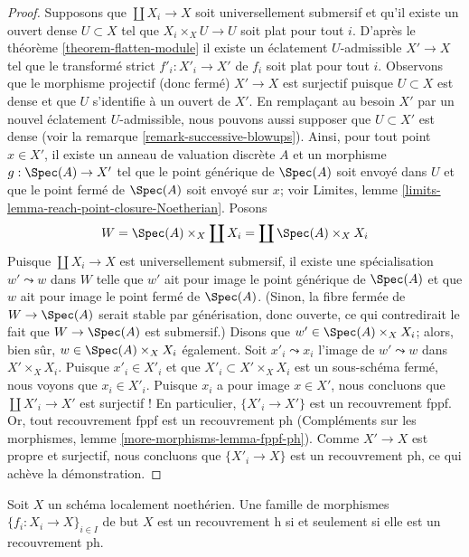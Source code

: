 \begin{proof}
\medskip\noindent
Supposons que $\coprod X_i \to X$ soit universellement submersif et
qu'il existe un ouvert dense $U \subset X$ tel que
$X_i \times_X U \to U$ soit plat pour tout $i$.
D'après le théorème \ref{theorem-flatten-module}
il existe un éclatement $U$-admissible $X' \to X$ tel que
le transformé strict $f'_i : X'_i \to X'$ de $f_i$ soit plat pour tout $i$.
Observons que le morphisme projectif (donc fermé) $X' \to X$
est surjectif puisque $U \subset X$ est dense et que $U$ s'identifie
à un ouvert de $X'$. En remplaçant au besoin $X'$ par un nouvel
éclatement $U$-admissible, nous pouvons aussi supposer que $U \subset X'$ est dense
(voir la remarque \ref{remark-successive-blowups}).
Ainsi, pour tout point $x \in X'$, il existe un anneau de valuation discrète $A$
et un morphisme $g : \Spec(A) \to X'$ tel que le point
générique de $\Spec(A)$ soit envoyé dans $U$ et que le point fermé de
$\Spec(A)$ soit envoyé sur $x$; voir Limites, lemme
\ref{limits-lemma-reach-point-closure-Noetherian}.
Posons
$$
W = \Spec(A) \times_X \coprod X_i = \coprod \Spec(A) \times_X X_i
$$
Puisque $\coprod X_i \to X$ est universellement submersif,
il existe une spécialisation $w' \leadsto w$ dans $W$
telle que $w'$ ait pour image le point générique de $\Spec(A)$
et que $w$ ait pour image le point fermé de $\Spec(A)$.
(Sinon, la fibre fermée de $W \to \Spec(A)$
serait stable par générisation, donc ouverte, ce qui
contredirait le fait que $W \to \Spec(A)$ est submersif.)
Disons que $w' \in \Spec(A) \times_X X_i$; alors, bien sûr,
$w \in \Spec(A) \times_X X_i$ également. Soit
$x'_i \leadsto x_i$ l'image de $w' \leadsto w$ dans
$X' \times_X X_i$. Puisque $x'_i \in X'_i$ et que
$X'_i \subset X' \times_X X_i$ est un sous-schéma fermé,
nous voyons que $x_i \in X'_i$. Puisque $x_i$ a pour image $x \in X'$,
nous concluons que
$\coprod X'_i \to X'$ est surjectif ! En particulier,
$\{X'_i \to X'\}$ est un recouvrement fppf. Or, tout recouvrement fppf est un recouvrement ph
(Compléments sur les morphismes, lemme \ref{more-morphisms-lemma-fppf-ph}).
Comme $X' \to X$ est propre et surjectif, nous concluons
que $\{X'_i \to X\}$ est un recouvrement ph, ce qui achève la démonstration.
\end{proof}

\begin{lemma}
\label{lemma-Noetherian-h-ph}
Soit $X$ un schéma localement noethérien. Une famille de morphismes
$\{f_i : X_i \to X\}_{i \in I}$ de but $X$ est un recouvrement h
si et seulement si elle est un recouvrement ph.
\end{lemma}

